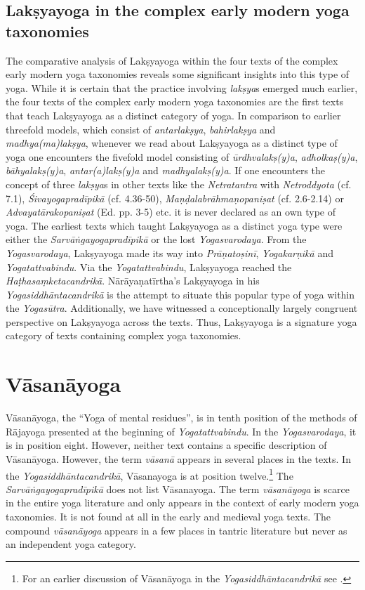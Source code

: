 \subsection{Lakṣyayoga in the complex early modern yoga taxonomies}

The comparative analysis of Lakṣyayoga within the four texts of the complex early modern yoga taxonomies reveals some significant insights into this type of yoga. While it is certain that the practice involving \textit{lakṣya}s emerged much earlier, the four texts of the complex early modern yoga taxonomies are the first texts that teach Lakṣyayoga as a distinct category of yoga. In comparison to earlier threefold models, which consist of \textit{antarlakṣya}, \textit{bahirlakṣya} and \textit{madhya(ma)lakṣya}, whenever we read about Lakṣyayoga as a distinct type of yoga one encounters the fivefold model consisting of \textit{ūrdhvalakṣ(y)a}, \textit{adholkaṣ(y)a}, \textit{bāhyalakṣ(y)a}, \textit{antar(a)lakṣ(y)a} and \textit{madhyalakṣ(y)a}. If one encounters the concept of three \textit{lakṣya}s in other texts like the \emph{Netratantra} with \emph{Netroddyota} (cf. 7.1), \emph{Śivayogapradīpikā} (cf. 4.36-50), \emph{Maṇḍalabrāhmaṇopaniṣat} (cf. 2.6-2.14) or \emph{Advayatārakopaniṣat} (Ed. pp. 3-5) etc. it is never declared as an own type of yoga. The earliest texts which taught Lakṣyayoga as a distinct yoga type were either the \emph{Sarvāṅgayogapradīpikā} or the lost \emph{Yogasvarodaya}. From the \emph{Yogasvarodaya}, Lakṣyayoga made its way into \emph{Prāṇatoṣinī}, \emph{Yogakarṇikā} and \emph{Yogatattvabindu}. Via the \emph{Yogatattvabindu}, Lakṣyayoga reached the \emph{Haṭhasaṃketacandrikā}. Nārāyaṇatīrtha's Lakṣyayoga in his \emph{Yogasiddhāntacandrikā} is the attempt to situate this popular type of yoga within the \emph{Yogasūtra}. Additionally, we have witnessed a conceptionally largely congruent perspective on Lakṣyayoga across the texts. Thus, Lakṣyayoga is a signature yoga category of texts containing complex yoga taxonomies.

\section{Vāsanāyoga}
\label{vasanayogaintro}

Vāsanāyoga, the ``Yoga of mental residues'', is in tenth position of the methods of Rājayoga presented at the beginning of \textit{Yogatattvabindu}. In the \textit{Yogasvarodaya}, it is in position eight. However, neither text contains a specific description of Vāsanāyoga. However, the term \textit{vāsanā} appears in several places in the texts. In the \textit{Yogasiddhāntacandrikā}, Vāsanayoga is at position twelve.\footnote{For an earlier discussion of Vāsanāyoga in the \textit{Yogasiddhāntacandrikā} see \citeauthor[2004: 82-85]{penna2004}.} The \textit{Sarvāṅgayogapradīpikā} does not list Vāsanayoga. The term \textit{vāsanāyoga} is scarce in the entire yoga literature and only appears in the context of early modern yoga taxonomies. It is not found at all in the early and medieval yoga texts. The compound \textit{vāsanāyoga} appears in a few places in tantric literature but never as an independent yoga category.  

